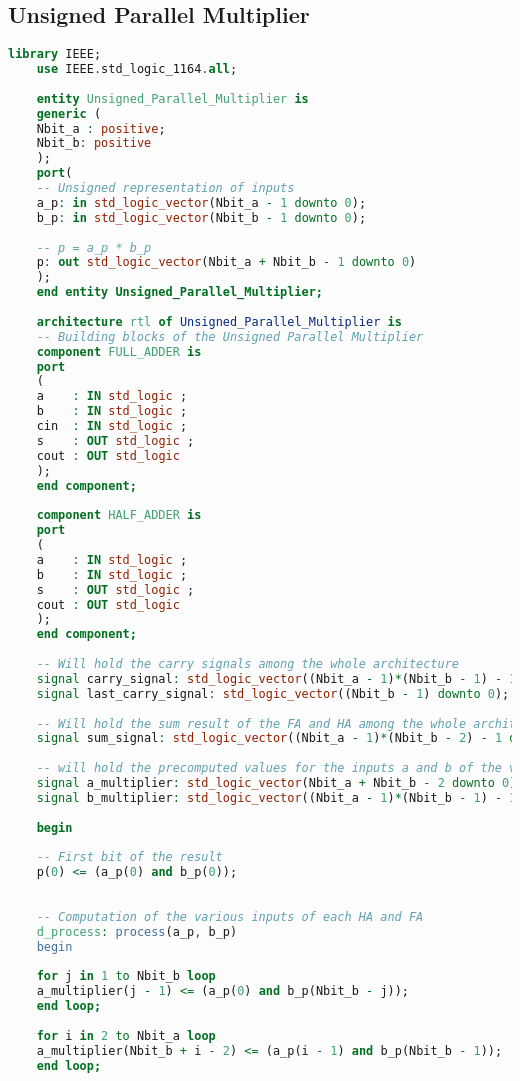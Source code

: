 \subsection{Unsigned Parallel Multiplier}
\begin{lstlisting}[language=VHDL]
	library IEEE;
	use IEEE.std_logic_1164.all;
	
	entity Unsigned_Parallel_Multiplier is
	generic (
	Nbit_a : positive; 
	Nbit_b: positive
	);
	port(
	-- Unsigned representation of inputs
	a_p: in std_logic_vector(Nbit_a - 1 downto 0);
	b_p: in std_logic_vector(Nbit_b - 1 downto 0);
	
	-- p = a_p * b_p
	p: out std_logic_vector(Nbit_a + Nbit_b - 1 downto 0)
	);
	end entity Unsigned_Parallel_Multiplier;
	
	architecture rtl of Unsigned_Parallel_Multiplier is
	-- Building blocks of the Unsigned Parallel Multiplier
	component FULL_ADDER is
	port
	(
	a    : IN std_logic ;
	b    : IN std_logic ;
	cin  : IN std_logic ;
	s    : OUT std_logic ;
	cout : OUT std_logic 
	);
	end component;
	
	component HALF_ADDER is
	port
	(
	a    : IN std_logic ;
	b    : IN std_logic ;
	s    : OUT std_logic ;
	cout : OUT std_logic 
	);
	end component;
	
	-- Will hold the carry signals among the whole architecture
	signal carry_signal: std_logic_vector((Nbit_a - 1)*(Nbit_b - 1) - 1 downto 0);
	signal last_carry_signal: std_logic_vector((Nbit_b - 1) downto 0);
	
	-- Will hold the sum result of the FA and HA among the whole architecture
	signal sum_signal: std_logic_vector((Nbit_a - 1)*(Nbit_b - 2) - 1 downto 0);  
	
	-- will hold the precomputed values for the inputs a and b of the various Half Adder and Full Adder
	signal a_multiplier: std_logic_vector(Nbit_a + Nbit_b - 2 downto 0);
	signal b_multiplier: std_logic_vector((Nbit_a - 1)*(Nbit_b - 1) - 1 downto 0);
	
	begin
	
	-- First bit of the result
	p(0) <= (a_p(0) and b_p(0));
	
	
	-- Computation of the various inputs of each HA and FA
	d_process: process(a_p, b_p)
	begin
	
	for j in 1 to Nbit_b loop
	a_multiplier(j - 1) <= (a_p(0) and b_p(Nbit_b - j));
	end loop;
	
	for i in 2 to Nbit_a loop
	a_multiplier(Nbit_b + i - 2) <= (a_p(i - 1) and b_p(Nbit_b - 1));
	end loop;
	

\end{lstlisting}
